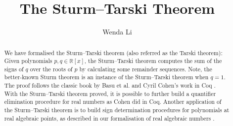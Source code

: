 \documentclass[11pt,a4paper]{article}
\begin{document}
\title{The Sturm--Tarski Theorem}
\author{Wenda Li}
\maketitle

\begin{abstract}
  We have formalised the Sturm--Tarski theorem (also referred as the Tarski theorem): Given polynomials $p, q \in \mathbb{R}[x]$, the Sturm--Tarski theorem computes the sum of the signs of $q$ over the roots of $p$ by calculating some remainder sequences. Note, the better-known Sturm theorem is an instance of the Sturm--Tarski theorem when $q=1$. The proof follows the classic book by Basu et al. \cite{Basu:2006:ARA:1197095} and Cyril Cohen's work in Coq \cite{cohen_phd}. With the Sturm--Tarski theorem proved, it is possible to further build a quantifier elimination procedure for real numbers as Cohen did in Coq.
  Another application of the Sturm--Tarski theorem is to build sign determination procedures for polynomials at real algebraic points, as described in our formalisation of real algebraic numbers \cite{Li_CPP_16}.
\end{abstract}






\end{document}
